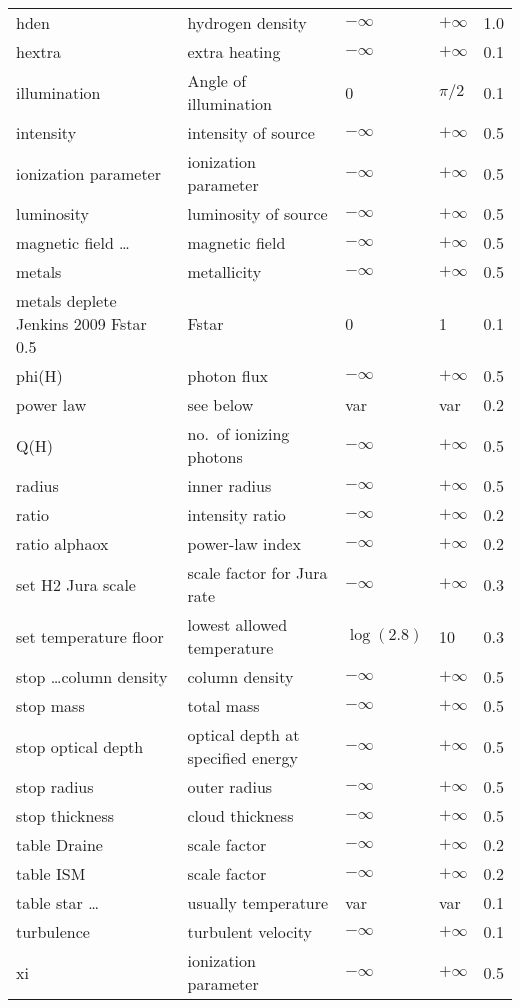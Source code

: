 \begin{table}
\begin{tabular}{lllll}
hden& hydrogen density& $-\infty$& $+\infty$& 1.0\\
hextra& extra heating& $-\infty$& $+\infty$& 0.1\\
illumination& Angle of illumination& 0& $\pi/2$& 0.1\\
intensity& intensity of source& $-\infty$& $+\infty$& 0.5\\
ionization parameter& ionization parameter& $-\infty$& $+\infty$& 0.5\\
luminosity& luminosity of source& $-\infty$& $+\infty$& 0.5\\
magnetic field \ldots& magnetic field& $-\infty$& $+\infty$& 0.5\\
metals& metallicity& $-\infty$& $+\infty$& 0.5\\
metals deplete Jenkins 2009 Fstar 0.5 & Fstar & 0 & 1 & 0.1 \\
phi(H)& photon flux& $-\infty$& $+\infty$& 0.5\\
power law& see below& var& var& 0.2\\
Q(H)& no.\ of ionizing photons& $-\infty$& $+\infty$& 0.5\\
radius& inner radius& $-\infty$& $+\infty$& 0.5\\
ratio& intensity ratio& $-\infty$& $+\infty$& 0.2\\
ratio alphaox& power-law index& $-\infty$& $+\infty$& 0.2\\
set H2 Jura scale& scale factor for Jura rate& $-\infty$& $+\infty$& 0.3\\
set temperature floor& lowest allowed temperature& $\log(2.8)$& 10& 0.3\\
stop \ldots column density& column density& $-\infty$& $+\infty$& 0.5\\
stop mass & total mass& $-\infty$& $+\infty$& 0.5\\
stop optical depth& optical depth at specified energy & $-\infty$& $+\infty$& 0.5\\
stop radius& outer radius& $-\infty$& $+\infty$& 0.5\\
stop thickness& cloud thickness& $-\infty$& $+\infty$& 0.5\\
table Draine& scale factor& $-\infty$& $+\infty$& 0.2\\
table ISM& scale factor& $-\infty$& $+\infty$& 0.2\\
table star \ldots& usually temperature& var& var& 0.1\\
turbulence& turbulent velocity& $-\infty$& $+\infty$& 0.1\\
xi& ionization parameter& $-\infty$& $+\infty$& 0.5\\
\hline
\end{tabular}
\end{table}

